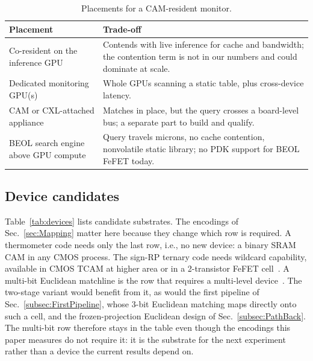 \documentclass[conference]{IEEEtran}
\newcommand{\cam}{{CAM}\xspace}
\newcommand{\tcam}{{TCAM}\xspace}
\newcommand{\fefet}{{FeFET}\xspace}
\newcommand{\signrp}{{sign-RP}\xspace}
\begin{document}
\begin{table}[t]
\centering
\caption{Placements for a \cam-resident monitor.}
\label{tab:placement}
{\footnotesize
\begin{tabular}{@{}p{}p{}@{}}
\toprule
\textbf{Placement} & \textbf{Trade-off} \\
\midrule
Co-resident on the inference GPU &
Contends with live inference for cache and bandwidth; the contention
term is not in our numbers and could dominate at scale. \\
Dedicated monitoring GPU(s) &
Whole GPUs scanning a static table, plus cross-device latency. \\
\cam or CXL-attached appliance &
Matches in place, but the query crosses a board-level bus; a separate
part to build and qualify. \\
BEOL search engine above GPU compute &
Query travels microns, no cache contention, nonvolatile static library;
no PDK support for BEOL \fefet today. \\
\bottomrule
\end{tabular}}
\end{table}

\subsection{Device candidates}
\label{subsec:Devices}
Table~\ref{tab:devices} lists candidate substrates. The encodings of
Sec.~\ref{sec:Mapping} matter here because they change which row is
required. A thermometer code needs only the last row, i.e., no new
device: a binary SRAM \cam in any CMOS process. The \signrp ternary code
needs wildcard capability, available in CMOS \tcam at higher area or in a
2-transistor \fefet cell~\cite{ni2019fetcam}. A multi-bit Euclidean
matchline is the row that requires a multi-level
device~\cite{kazemi2021fefetcam}. The two-stage variant would benefit
from it, as would the first pipeline of Sec.~\ref{subsec:FirstPipeline},
whose 3-bit Euclidean matching maps directly onto such a cell, and the
frozen-projection Euclidean design of Sec.~\ref{subsec:PathBack}. The
multi-bit row therefore stays in the table even though the encodings
this paper measures do not require it: it is the substrate for the next
experiment rather than a device the current results depend on.
\end{document}
